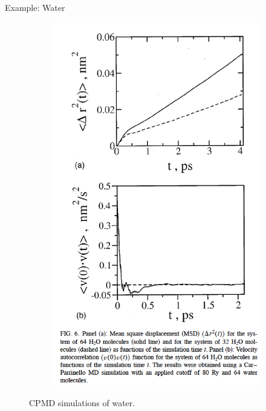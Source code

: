 \documentclass[aspectratio=169]{beamer}
\begin{document}
\begin{frame}{Example: Water}
\begin{figure}
\begin{subfigure}{0.2\textwidth}
\includegraphics[width=\linewidth]{lectures/figures/13-H2O_2.png}
    \end{subfigure}
    \caption{CPMD simulations of water.\cite{izvekovCarParrinelloMolecularDynamics2002}}
    \label{fig}
\end{figure} 
\end{frame} 
\end{document}
